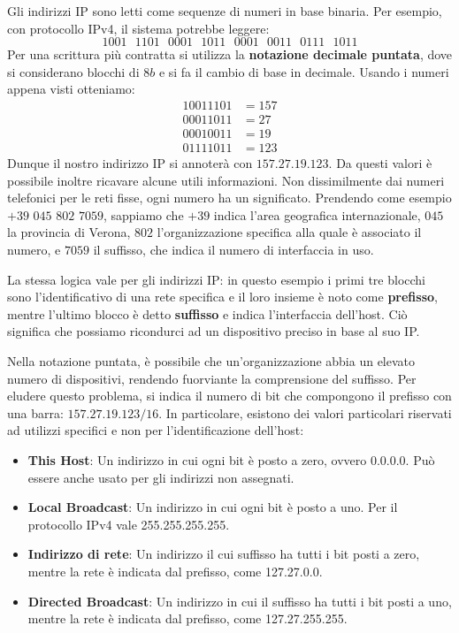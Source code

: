 Gli indirizzi IP sono letti come sequenze di numeri in base binaria. Per esempio, con protocollo IPv4, il sistema potrebbe leggere: \[1001\text{ } 1101\text{ } 0001\text{ } 1011\text{ } 0001\text{ } 0011\text{ } 0111\text{ } 1011\]
\noindent Per una scrittura più contratta si utilizza la \textbf{notazione decimale puntata}, dove si considerano blocchi di $8b$ e si fa il cambio di base in decimale. Usando i numeri appena visti otteniamo: \begin{equation}
	\begin{split}
		10011101 &= 157\\
		00011011 &= 27\\
		00010011 &= 19\\
		01111011 &= 123
	\end{split}
\end{equation}
\noindent Dunque il nostro indirizzo IP si annoterà con $157.27.19.123$. Da questi valori è possibile inoltre ricavare alcune utili informazioni. Non dissimilmente dai numeri telefonici per le reti fisse, ogni numero ha un significato. Prendendo come esempio $+39$ $045$ $802$ $7059$, sappiamo che $+39$ indica l'area geografica internazionale, $045$ la provincia di Verona, $802$ l'organizzazione specifica alla quale è associato il numero, e $7059$ il suffisso, che indica il numero di interfaccia in uso.\par
La stessa logica vale per gli indirizzi IP: in questo esempio i primi tre blocchi sono l'identificativo di una rete specifica e il loro insieme è noto come \textbf{prefisso}, mentre l'ultimo blocco è detto \textbf{suffisso} e indica l'interfaccia dell'host. Ciò significa che possiamo ricondurci ad un dispositivo preciso in base al suo IP.\par
Nella notazione puntata, è possibile che un'organizzazione abbia un elevato numero di dispositivi, rendendo fuorviante la comprensione del suffisso. Per eludere questo problema, si indica il numero di bit che compongono il prefisso con una barra: $157.27.19.123/16$. In particolare, esistono dei valori particolari riservati ad utilizzi specifici e non per l'identificazione dell'host: \begin{itemize}
	\item \textbf{This Host}: Un indirizzo in cui ogni bit è posto a zero, ovvero 0.0.0.0. Può essere anche usato per gli indirizzi non assegnati.
	\item \textbf{Local Broadcast}: Un indirizzo in cui ogni bit è posto a uno. Per il protocollo IPv4 vale 255.255.255.255.
	\item \textbf{Indirizzo di rete}: Un indirizzo il cui suffisso ha tutti i bit posti a zero, mentre la rete è indicata dal prefisso, come 127.27.0.0.
	\item \textbf{Directed Broadcast}: Un indirizzo in cui il suffisso ha tutti i bit posti a uno, mentre la rete è indicata dal prefisso, come 127.27.255.255.
\end{itemize}
